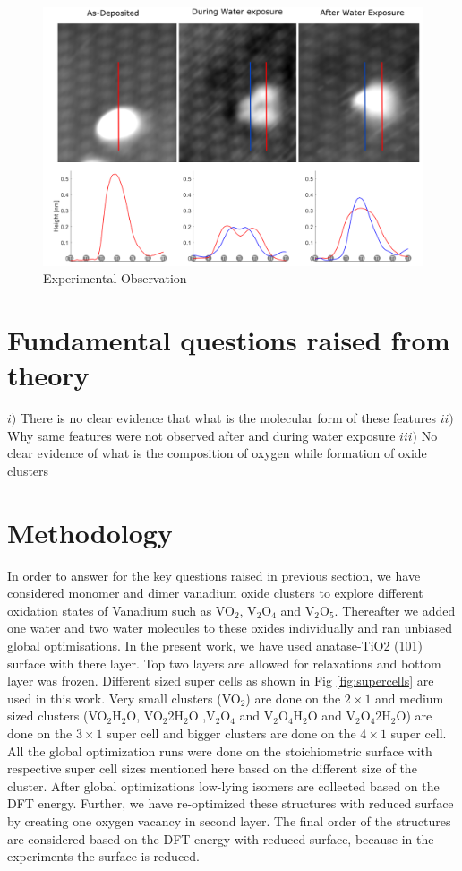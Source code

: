 \documentclass[aip,amsmath,amssymb,reprint, jcp]{revtex4-1}
\begin{document}
\begin{figure}[h]
\includegraphics[width=1.0\textwidth]{Expert_claim.png}
\caption{Experimental Observation}
\label{fig:exptobser}
\end{figure}

\section{Fundamental questions raised from theory}
$i)$ There is no clear evidence that what is the molecular form of these features
$ii)$  Why same features were not observed after and during water exposure 
$iii)$ No clear evidence of what is the composition of oxygen while formation of oxide clusters 

\section{Methodology}
In order to answer for the key questions raised in previous section, we have considered monomer and dimer vanadium oxide clusters to explore different oxidation states of Vanadium such as VO$_2$, V$_2$O$_4$ and V$_2$O$_5$.
Thereafter we added one water and two water molecules to these oxides individually and ran unbiased global optimisations. In the present work, we have used anatase-TiO2 (101) surface with there layer. Top two layers are allowed for relaxations and bottom layer was frozen. Different sized super cells as shown in Fig \ref{fig:supercells} are used in this work. Very small clusters (VO$_2$) are done on the $2\times1$ and medium sized clusters (VO$_2$H$_2$O, VO$_2$2H$_2$O ,V$_2$O$_4$ and V$_2$O$_4$H$_2$O and V$_2$O$_4$2H$_2$O) are done on the $3\times1$ super cell and bigger clusters are done on the $4\times1$ super cell. All the global optimization runs were done on the stoichiometric surface with respective super cell sizes mentioned here based on the  different size of the cluster. After global optimizations low-lying isomers are collected based on the DFT energy. Further, we have re-optimized these structures with reduced surface by creating one oxygen vacancy in second layer. The final order of the structures are considered based on the DFT energy with reduced surface, because in the experiments the surface is reduced.   
\end{document}
